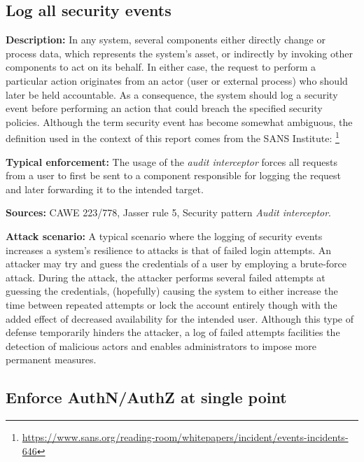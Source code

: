 
\subsection{Log all security events } 

\textbf{Description:} In any system, several components either directly change or process data, which represents the system's asset, or indirectly by invoking other components to act on its behalf. In either case, the request to perform a particular action originates from an actor (user or external process) who should later be held accountable.  As a consequence, the system should log a security event before performing an action that could breach the specified security policies. Although the term security event has become somewhat ambiguous, the definition used in the context of this report comes from the SANS Institute:   \footnote{\url{https://www.sans.org/reading-room/whitepapers/incident/events-incidents-646}}

\textbf{Typical enforcement:} The usage of the \textit{audit interceptor} forces all requests from a user to first be sent to a component responsible for logging the request and later forwarding it to the intended target. 

\textbf{Sources:} CAWE 223/778, Jasser rule 5, Security pattern \textit{Audit interceptor}.

\textbf{Attack scenario:} A typical scenario where the logging of security events increases a system's resilience to attacks is that of failed login attempts. An attacker may try and guess the credentials of a user by employing a brute-force attack. During the attack, the attacker performs several failed attempts at guessing the credentials, (hopefully) causing the system to either increase the time between repeated attempts or lock the account entirely though with the added effect of decreased availability for the intended user. Although this type of defense temporarily hinders the attacker, a log of failed attempts facilities the detection of malicious actors and enables administrators to impose more permanent measures. 

\subsection{Enforce AuthN/AuthZ at single point} 
 

